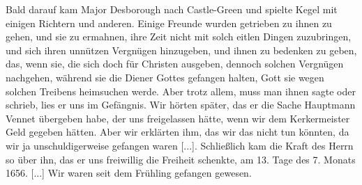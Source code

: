 
Bald darauf kam Major Desborough 
nach Castle-Green und
spielte Kegel mit einigen 
Richtern und anderen. Einige Freunde
wurden getrieben zu ihnen zu gehen, und sie zu ermahnen, ihre
Zeit nicht mit solch eitlen Dingen zuzubringen, und sich ihren
unnützen Vergnügen hinzugeben, 
und ihnen zu bedenken zu geben,
das, wenn sie, die sich doch für Christen ausgeben, dennoch solchen
Vergnügen nachgehen, während sie die Diener Gottes gefangen
halten, Gott sie wegen solchen Treibens heimsuchen werde. Aber
trotz allem, muss man ihnen sagte oder schrieb, lies er uns im
Gefängnis. Wir hörten später, das er die Sache Hauptmann
Vennet übergeben habe, der uns freigelassen hätte, wenn wir
dem Kerkermeister Geld gegeben hätten. Aber wir erklärten ihm,
das wir das nicht tun könnten, da wir ja unschuldigerweise 
gefangen waren [...]. Schließlich kam die Kraft des Herrn so
über ihn, das er uns freiwillig die Freiheit schenkte, am 13. Tage
des 7. Monats 1656. [...] Wir waren seit dem Frühling
gefangen gewesen.
